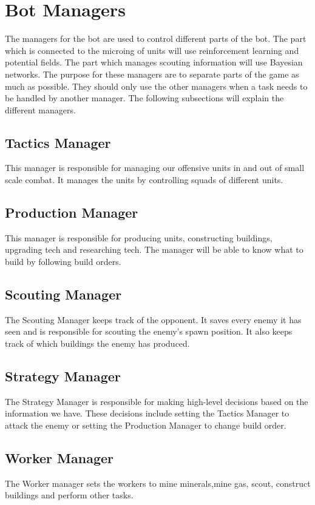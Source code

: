 \section{Bot Managers}
	\label{design::managers}
	The managers for the bot are used to control different parts of the bot. The part which is connected to the microing of units will use 
	reinforcement learning and potential fields. The part which manages scouting information will use Bayesian networks. 
	The purpose for these managers are to separate parts of the game as much as possible. They should only use the other managers when a task needs to be handled 
	by another manager. The following subsections will explain the different managers.
	
	\subsection*{Tactics Manager}
		This manager is responsible for managing our offensive units in and out of small scale combat. It manages the units by controlling squads of different 
		units.
	\subsection*{Production Manager}
		This manager is responsible for producing units, constructing buildings, upgrading tech and researching tech. The manager will be able to 
		know what to build by following build orders.
	\subsection*{Scouting Manager}
		The Scouting Manager keeps track of the opponent. It saves every enemy it has seen and is responsible for scouting the enemy's spawn position. It also keeps track of which buildings the enemy has produced.
	\subsection*{Strategy Manager}
		The Strategy Manager is responsible for making high-level decisions based on the information we have. These decisions include
		setting the Tactics Manager to attack the enemy or setting the Production Manager to change build order.
	\subsection*{Worker Manager}
		The Worker manager sets the workers to mine minerals,mine gas, scout, construct buildings and perform other tasks.

